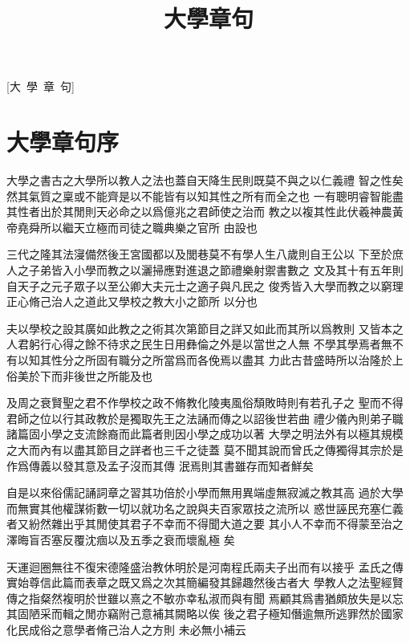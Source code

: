 \documentclass{zhvt-classic}
\title{大學章句}
\begin{document}
[大~學~章~句]

\cleardoublepage

\setcounter{page}{1}
\tableofcontents

\mainmatter

\chapter*{大學章句序}

大學之書古之大學所以教人之法也蓋自天降生民則既莫不與之以仁義禮
智之性矣然其氣質之稟或不能齊是以不能皆有以知其性之所有而全之也
一有聰明睿智能盡其性者出於其閒則天必命之以爲億兆之君師使之治而
教之以複其性此伏羲神農黃帝堯舜所以繼天立極而司徒之職典樂之官所
由設也

三代之隆其法寖備然後王宮國都以及閭巷莫不有學人生八歲則自王公以
下至於庶人之子弟皆入小學而教之以灑掃應對進退之節禮樂射禦書數之
文及其十有五年則自天子之元子眾子以至公卿大夫元士之適子與凡民之
俊秀皆入大學而教之以窮理正心脩己治人之道此又學校之教大小之節所
以分也

夫以學校之設其廣如此教之之術其次第節目之詳又如此而其所以爲教則
又皆本之人君躬行心得之餘不待求之民生日用彝倫之外是以當世之人無
不學其學焉者無不有以知其性分之所固有職分之所當爲而各俛焉以盡其
力此古昔盛時所以治隆於上俗美於下而非後世之所能及也

及周之衰賢聖之君不作學校之政不脩教化陵夷風俗頹敗時則有若孔子之
聖而不得君師之位以行其政教於是獨取先王之法誦而傳之以詔後世若曲
禮少儀內則弟子職諸篇固小學之支流餘裔而此篇者則因小學之成功以著
大學之明法外有以極其規模之大而內有以盡其節目之詳者也三千之徒蓋
莫不聞其說而曾氏之傳獨得其宗於是作爲傳義以發其意及孟子沒而其傳
泯焉則其書雖存而知者鮮矣

自是以來俗儒記誦詞章之習其功倍於小學而無用異端虛無寂滅之教其高
過於大學而無實其他權謀術數一切以就功名之說與夫百家眾技之流所以
惑世誣民充塞仁義者又紛然雜出乎其閒使其君子不幸而不得聞大道之要
其小人不幸而不得蒙至治之澤晦盲否塞反覆沈痼以及五季之衰而壞亂極
矣

天運迴圈無往不復宋德隆盛治教休明於是河南程氏兩夫子出而有以接乎
孟氏之傳實始尊信此篇而表章之既又爲之次其簡編發其歸趣然後古者大
學教人之法聖經賢傳之指粲然複明於世雖以熹之不敏亦幸私淑而與有聞
焉顧其爲書猶頗放失是以忘其固陋采而輯之閒亦竊附己意補其闕略以俟
後之君子極知僭逾無所逃罪然於國家化民成俗之意學者脩己治人之方則
未必無小補云
\end{document}
